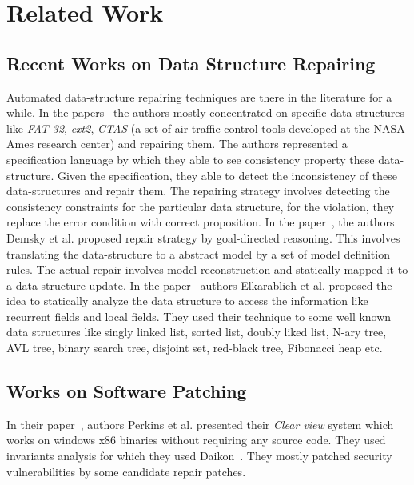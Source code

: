 

\section{Related Work}
\label{sec:relatedWork}

\subsection{Recent Works on Data Structure Repairing}
\label{subsec:RecWorksDataStructure}

Automated data-structure repairing techniques are there in the literature for a
while. In the papers~\cite{conf/oopsla/DemskyR03, Demsky03automaticdata,
conf/icse/DemskyR05, conf/issre/DemskyR03, conf/issta/DemskyEGMPR06} the authors
mostly concentrated on specific data-structures like \emph{FAT-32}, \emph{ext2},
\emph{CTAS} (a set of air-traffic control tools developed at the NASA Ames
research center) and repairing them. The authors represented a specification
language by which they able to see consistency property these data-structure.
Given the specification, they able to detect the inconsistency of these
data-structures and repair them.
The repairing strategy involves detecting the consistency constraints for the
particular data structure, for the violation, they replace the error condition
with correct proposition. In the paper~\cite{conf/icse/DemskyR05}, the authors
Demsky et al. proposed repair strategy by goal-directed reasoning. This involves
translating the data-structure to a abstract model by a set of model definition
rules. The actual repair involves model reconstruction and statically mapped it
to a data structure update. In the paper~\cite{conf/oopsla/2007} authors
Elkarablieh et al. proposed the idea to statically analyze the data structure to
access the information like recurrent fields and local fields. They used their
technique to some well known data structures like singly linked list, sorted
list, doubly liked list, N-ary tree, AVL tree, binary search tree, disjoint set,
red-black tree, Fibonacci heap etc.

\subsection{Works on Software Patching}
\label{subsec:RecWorksSoftPatch}

In their paper~\cite{conf/sosp/PerkinsKLABCPSSSWZER09}, authors Perkins et al.
presented their \emph{Clear view} system which works on windows x86 binaries
without requiring any source code. They used invariants analysis for which
they used Daikon~\cite{DBLP:journals/scp/ErnstPGMPTX07}. They mostly patched
security vulnerabilities by some candidate repair patches.


